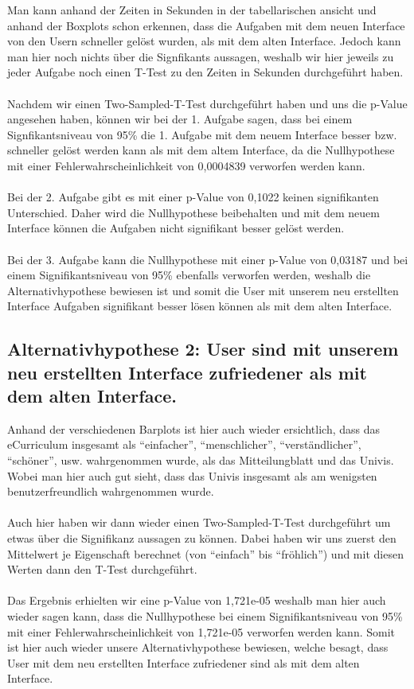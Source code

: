 \documentclass[a4paper,10pt]{scrartcl}
\begin{document}
Man kann anhand der Zeiten in Sekunden in der tabellarischen ansicht und anhand der Boxplots schon erkennen, dass die Aufgaben
mit dem neuen Interface von den Usern schneller gelöst wurden, als mit dem alten Interface. Jedoch kann
man hier noch nichts über die Signfikants aussagen, weshalb wir hier jeweils zu jeder Aufgabe noch einen T-Test zu den
Zeiten in Sekunden durchgeführt haben.
\\ \\
Nachdem wir einen Two-Sampled-T-Test durchgeführt haben und uns die p-Value angesehen haben, können wir bei
der 1. Aufgabe sagen, dass bei einem Signfikantsniveau von 95\% die 1. Aufgabe mit dem neuem Interface besser bzw. schneller gelöst werden
kann als mit dem altem Interface, da die Nullhypothese mit einer Fehlerwahrscheinlichkeit von 0,0004839 verworfen werden kann.
\\ \\
Bei der 2. Aufgabe gibt es mit einer p-Value von 0,1022 keinen signifikanten Unterschied. Daher wird die Nullhypothese beibehalten und
mit dem neuem Interface können die Aufgaben nicht signifikant besser gelöst werden.
\\ \\
Bei der 3. Aufgabe kann die Nullhypothese mit einer p-Value von 0,03187 und bei einem Signifikantsniveau von 95\% ebenfalls verworfen werden,
weshalb die Alternativhypothese bewiesen ist und somit die User mit unserem neu erstellten Interface Aufgaben signifikant besser lösen können
als mit dem alten Interface.

\subsection{Alternativhypothese 2: User sind mit unserem neu erstellten Interface zufriedener als mit dem alten Interface. }

Anhand der verschiedenen Barplots ist hier auch wieder ersichtlich, dass das eCurriculum insgesamt als ``einfacher'', ``menschlicher'', ``verständlicher'', ``schöner'', usw.
wahrgenommen wurde, als das Mitteilungblatt und das Univis. Wobei man hier auch gut sieht, dass das Univis insgesamt als am wenigsten benutzerfreundlich
wahrgenommen wurde. 
\\ \\
Auch hier haben wir dann wieder einen Two-Sampled-T-Test durchgeführt um etwas über die Signifikanz aussagen zu können. 
Dabei haben wir uns zuerst den Mittelwert je Eigenschaft
berechnet (von ``einfach'' bis ``fröhlich'') und mit diesen Werten dann den T-Test durchgeführt.
\\ \\
Das Ergebnis erhielten wir eine p-Value von 1,721e-05 weshalb man hier auch wieder sagen kann, dass die Nullhypothese bei
einem Signifikantsniveau von 95\% mit einer Fehlerwahrscheinlichkeit von 1,721e-05 verworfen werden kann. Somit ist hier auch wieder unsere
Alternativhypothese bewiesen, welche besagt, dass User mit dem neu erstellten Interface zufriedener sind als mit dem alten Interface.
\end{document}
